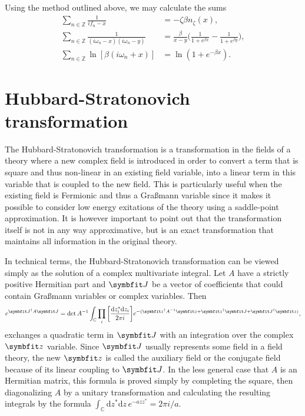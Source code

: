 Using the method outlined above, we may calculate the sums
\begin{subequations}
    \label{eq:Field:Mats:sums}
    \begin{align}
        \label{eq:Field:mats:sums:singlePole}
        \sum_{n\in\mathbb{Z}}\frac{1}{if_n-x} &= -\zeta\beta n_\zeta(x),\\
        \sum_{n\in\mathbb{Z}}\frac{1}{(i\omega_n - x)(i\omega_n - y)} &= \frac{\beta}{x-y}\bigg(\frac{1}{1+e^{\beta x}} - \frac{1}{1+e^{\beta y}}\bigg),\label{eq:Field:Mats:sums:twoPoles}\\
        \sum_{n\in\mathbb{Z}}\ln[\beta(i\omega_n + x)] &= \ln(1+e^{-\beta x}).\label{eq:Field:Mats:sums:ln}
    \end{align}
\end{subequations}

\section{Hubbard-Stratonovich transformation}

The Hubbard-Stratonovich transformation is a transformation in the fields of a theory where a new complex field is introduced
in order to convert a term that is square and thus non-linear in an existing field variable, into a linear term in this
variable that is coupled to the new field. This is particularly useful when the existing field is Fermionic and thus
a Gra\ss mann variable since it makes it possible to consider low energy exitations of the theory using \eg a saddle-point
approximation. It is however important to point out that the transformation itself is not in any way approximative, but is
an exact transformation that maintains all information in the original theory.

In technical terms, the Hubbard-Stratonovich transformation can be viewed simply as the solution of a complex multivariate integral.
Let $A$ have a strictly positive Hermitian part and $\v{J}$ be a vector of
coefficients that could contain Gra\ss mann variables or complex variables. Then
\begin{equation}
    \label{eq:Field:HS:complexIntegral}
    e^{\v{J}^\dagger A \v{J}} = \det A^{-1}\int_{\mathbb{C}}\prod_{i}\bigg[\frac{\mathrm{d}z_i^\ast\mathrm{d}z_i}{2\pi i}\bigg]e^{-(\v{z}^\dagger A^{-1}\v{z} + \v{z}^\dagger \v{J} + \v{J}^\dagger\v{z})},
\end{equation}
exchanges a quadratic term in $\v{J}$ with an integration over the complex $\v{z}$ variable.
Since $\v{J}$ usually represents some field in a field theory, the new $\v{z}$ is called the auxiliary field or the conjugate
field because of its linear coupling to $\v{J}$.
In the less general case that $A$ is an Hermitian matrix, this formula is proved simply by completing the square, then
diagonalizing $A$ by a unitary transformation and calculating the resulting integrals by the formula 
$\int_{\mathbb{C}}\!\mathrm{d}z^\ast\mathrm{d}z\,e^{-azz^\ast} = 2\pi i /a$. 

